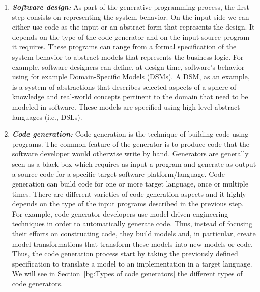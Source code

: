 \begin{enumerate}
	\item \textbf{\textit{Software design:}} 
	As part of the generative programming process, the first step consists on representing the system behavior. 
	On the input side we can either use code as the input or an abstract form that represents the design. It depends on the type of the code generator and on the input source program it requires. These programs can range from a formal specification of the system behavior to abstract models that represents the business logic.
	For example, software designers can define, at design time, software’s behavior using for example Domain-Specific Models (DSMs).
	A DSM, as an example, is a system of abstractions that describes selected aspects of a sphere of knowledge and real-world concepts pertinent to the domain that need to be modeled in software. These models are specified using high-level abstract languages (i.e., DSLs). %
	
	\item \textbf{\textit{Code generation:}} 
	Code generation is the technique of building code using programs. The common feature of the generator is to produce code that the software developer would otherwise write by hand.
	Generators are generally seen as a black box which requires as input a program and generate as output a source code for a specific target software platform/language. %
	Code generation can build code for one or more target language, once or multiple times. There are different varieties of code generation aspects and it highly depends on the type of the input programs described in the previous step. 
	For example, code generator developers use model-driven engineering techniques in order to automatically generate code. Thus, instead of focusing their efforts on constructing code, they build models and, in particular, create model transformations that transform these models into new models or code. Thus, the code generation process start by taking the previously defined specification to translate a model to an implementation in a target language. We will see in Section~\ref{bg:Types of code generators} the different types of code generators.
	

\end{enumerate}
